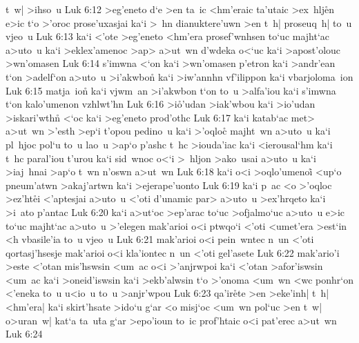 t~w|
>ihso~u\bibvsend
\vs Luk 6:12
>eg'eneto
d`e
>en
ta~ic
<hm'eraic
ta'utaic
>ex~hlj\r{e}n
e>ic
t`o
>'oroc
prose'uxasjai
ka`i
>~hn
dianuktere'uwn
>en
t~h|
proseuq~h|
to~u
vjeo~u\bibvsend
\vs Luk 6:13
ka`i
<'ote
>eg'eneto
<hm'era
prosef'wnhsen
to`uc
majht`ac
a>uto~u
ka`i
>eklex'amenoc
>ap>
a>ut~wn
d'wdeka
o<`uc
ka`i
>apost'olouc
>wn'omasen\bibvsend
\vs Luk 6:14
s'imwna
<`on
ka`i
>wn'omasen
p'etron
ka`i
>andr'ean
t`on
>adelf`on
a>uto~u
>i'akwbon\r{}
ka`i
>iw'annhn
vf'ilippon
ka`i
vbarjoloma~ion\bibvsend
\vs Luk 6:15
matja~ion\r{}
ka`i
vjwm~an
>i'akwbon
t`on
to~u
>alfa'iou
ka`i
s'imwna
t`on
kalo'umenon
vzhlwt'hn\bibvsend
\vs Luk 6:16
>i\r{o}'udan
>iak'wbou
ka`i
>io'udan
>iskari'wthn\r{}
<`oc
ka`i
>eg'eneto
prod'othc\bibvsend
\vs Luk 6:17
ka`i
katab`ac
met>
a>ut~wn
>'esth
>ep`i
t'opou
pedino~u
ka`i
>'oqlo\r{c}
majht~wn
a>uto~u
ka`i
pl~hjoc
pol`u
to~u
lao~u
>ap`o
p'ashc
t~hc
>iouda'iac
ka`i
<ierousal`hm
ka`i
t~hc
paral'iou
t'urou
ka`i
sid~wnoc
o<`i
>~hljon
>ako~usai
a>uto~u
ka`i
>iaj~hnai
>ap`o
t~wn
n'oswn
a>ut~wn\bibvsend
\vs Luk 6:18
ka`i
o<i
>oqlo'umenoi\r{}
<up`o
pneum'atwn
>akaj'artwn
ka`i
>ejerape'uonto\bibvsend
\vs Luk 6:19
ka`i
p~ac
<o
>'oqloc
>ez'ht\r{e}i
<'aptesjai
a>uto~u
<'oti
d'unamic
par>
a>uto~u
>ex'hrqeto
ka`i
>i~ato
p'antac\bibvsend
\vs Luk 6:20
ka`i
a>ut`oc
>ep'arac
to`uc
>ofjalmo`uc
a>uto~u
e>ic
to`uc
majht`ac
a>uto~u
>'elegen
mak'arioi
o<i
ptwqo`i
<'oti
<umet'era
>est`in
<h
vbasile'ia
to~u
vjeo~u\bibvsend
\vs Luk 6:21
mak'arioi
o<i
pein~wntec
n~un
<'oti
qortasj'hsesje
mak'arioi
o<i
kla'iontec
n~un
<'oti
gel'asete\bibvsend
\vs Luk 6:22
mak'ario'i
>este
<'otan
mis'hswsin
<um~ac
o<i
>'anjrwpoi
ka`i
<'otan
>afor'iswsin
<um~ac
ka`i
>oneid'iswsin
ka`i
>ekb'alwsin
t`o
>'onoma
<um~wn
<wc
ponhr`on
<'eneka
to~u
u<io~u
to~u
>anjr'wpou\bibvsend
\vs Luk 6:23
qa'ir\r{e}te
>en
>eke'inh|
t~h|
<hm'era|
ka`i
skirt'hsate
>ido`u
g`ar
<o
misj`oc
<um~wn
pol`uc
>en
t~w|
o>uran~w|
kat`a
ta~u\r{t}a
g`ar
>epo'ioun
to~ic
prof'htaic
o<i
pat'erec
a>ut~wn\bibvsend
\vs Luk 6:24
